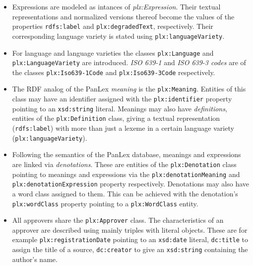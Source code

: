 \documentclass[sw]{iosart2c}
\newcommand{\vocab}[1]{\emph{#1}}
\begin{document}
\begin{itemize}
\item Expressions are modeled as intances of \vocab{plx:Expression}.
Their textual representations and normalized versions thereof become the 
values of the properties \texttt{rdfs:label} and \texttt{plx:degradedText}, respectively.
Their corresponding language variety is stated
using \texttt{plx:languageVariety}.

\item For language and language varieties the classes
\texttt{plx:Language} and \texttt{plx:LanguageVariety} are introduced.
\emph{ISO 639-1} and \emph{ISO 639-3 codes} are of the classes
\texttt{plx:Iso639-1Code} and \texttt{plx:Iso639-3Code} respectively.

\item The RDF analog of the PanLex \emph{meaning} is the \texttt{plx:Meaning}.
Entities of this class may have an identifier assigned with the
\texttt{plx:identifier} property pointing to an \texttt{xsd:string} literal.
Meanings may also have \emph{definitions}, entities of the
\texttt{plx:Definition} class, giving a textual representation
(\texttt{rdfs:label}) with more than just a lexeme in a certain
language variety (\texttt{plx:languageVariety}).

\item Following the semantics of the PanLex database, meanings and expressions are linked via \emph{denotations}.
These are entities of the \texttt{plx:Denotation} class pointing to meanings and expressions via the \texttt{plx:denotationMeaning} and \texttt{plx:denotationExpression} property respectively.
Denotations may also have a word class assigned to them.
This can be achieved with the denotation's \texttt{plx:wordClass} property pointing to a \texttt{plx:WordClass} entity.
\item All approvers share the \texttt{plx:Approver} class. The characteristics of an approver are described using mainly triples with literal objects.
These are for example \texttt{plx:registrationDate} pointing to an \texttt{xsd:date} literal,
\texttt{dc:title} to assign the title of a source,
\texttt{dc:creator} to give an \texttt{xsd:string} containing the author's name.
\end{itemize}
\end{document}
